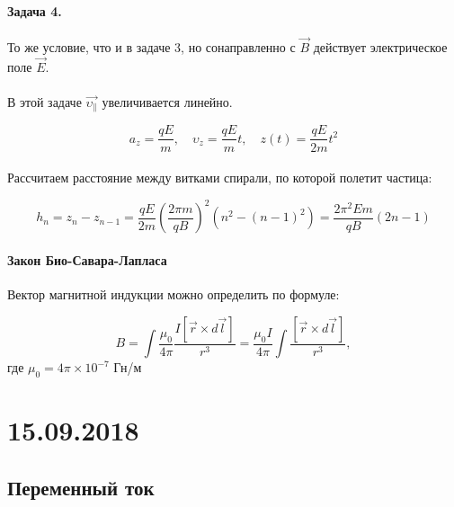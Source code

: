 \documentclass[dvipdfmx]{article}
\begin{document}
\paragraph{Задача 4.}

То же условие, что и в задаче 3, но сонаправленно с $\vec{B}$ действует электрическое поле $\vec{E}$.

\paragraph{}

В этой задаче $\vec{\upsilon_\parallel}$ увеличивается линейно.

\begin{equation*}
  a_z = \frac{qE}{m}, \quad \upsilon_z = \frac{qE}{m}t, \quad z(t) = \frac{qE}{2m}t^2
\end{equation*}

\paragraph{}

\newpage

Рассчитаем расстояние между витками спирали, по которой полетит частица:

\begin{equation*}
  h_n = z_n - z_{n-1} = \frac{qE}{2m}\left(\frac{2\pi m}{qB}\right)^2\left(n^2-(n-1)^2\right) = \frac{2\pi^2Em}{qB}(2n-1)
\end{equation*}

\paragraph{Закон Био-Савара-Лапласа} Вектор магнитной индукции можно определить по формуле:

\begin{equation*}
  B = \int \frac{\mu_0}{4\pi} \frac{ I[\vec{r} \times d \vec{l}] }{r^3} =
  \frac{\mu_0I}{4\pi}\int\frac{[\vec{r}\times d\vec{l}]}{r^3},
\end{equation*}
где $\mu_0 = 4\pi \times 10^{-7}$ Гн/м

\newpage
\noindent\makebox[\linewidth]{\rule{\paperwidth}{0.4pt}}
\section{15.09.2018}
\noindent\makebox[\linewidth]{\rule{\paperwidth}{0.4pt}}

\subsection{Переменный ток}
\end{document}

